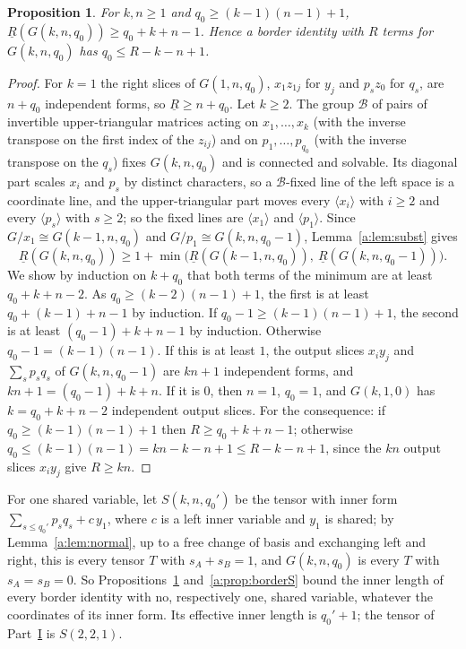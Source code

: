 \documentclass[11pt]{article}
\newtheorem{proposition}[theorem]{Proposition}
\theoremstyle{definition}
\theoremstyle{remark}
\begin{document}
\begin{proposition}\label{a:prop:borderG}
For $k,n\ge1$ and $q_0\ge(k-1)(n-1)+1$, $\underline R(G(k,n,q_0))\ge q_0+k+n-1$. Hence a border identity with $R$ terms for $G(k,n,q_0)$ has $q_0\le R-k-n+1$.
\end{proposition}

\begin{proof}
For $k=1$ the right slices of $G(1,n,q_0)$, $x_1z_{1j}$ for $y_j$ and $p_sz_0$ for $q_s$, are $n+q_0$ independent forms, so $\underline R\ge n+q_0$. Let $k\ge2$. The group $\mathcal B$ of pairs of invertible upper-triangular matrices acting on $x_1,\dots,x_k$ (with the inverse transpose on the first index of the $z_{ij}$) and on $p_1,\dots,p_{q_0}$ (with the inverse transpose on the $q_s$) fixes $G(k,n,q_0)$ and is connected and solvable. Its diagonal part scales $x_i$ and $p_s$ by distinct characters, so a $\mathcal B$-fixed line of the left space is a coordinate line, and the upper-triangular part moves every $\langle x_i\rangle$ with $i\ge2$ and every $\langle p_s\rangle$ with $s\ge2$; so the fixed lines are $\langle x_1\rangle$ and $\langle p_1\rangle$. Since $G/x_1\cong G(k-1,n,q_0)$ and $G/p_1\cong G(k,n,q_0-1)$, Lemma~\ref{a:lem:subst} gives
\[
\underline R(G(k,n,q_0))\ge1+\min\big(\underline R(G(k-1,n,q_0)),\ \underline R(G(k,n,q_0-1))\big).
\]
We show by induction on $k+q_0$ that both terms of the minimum are at least $q_0+k+n-2$. As $q_0\ge(k-2)(n-1)+1$, the first is at least $q_0+(k-1)+n-1$ by induction. If $q_0-1\ge(k-1)(n-1)+1$, the second is at least $(q_0-1)+k+n-1$ by induction. Otherwise $q_0-1=(k-1)(n-1)$. If this is at least $1$, the output slices $x_iy_j$ and $\sum_sp_sq_s$ of $G(k,n,q_0-1)$ are $kn+1$ independent forms, and $kn+1=(q_0-1)+k+n$. If it is $0$, then $n=1$, $q_0=1$, and $G(k,1,0)$ has $k=q_0+k+n-2$ independent output slices. For the consequence: if $q_0\ge(k-1)(n-1)+1$ then $R\ge q_0+k+n-1$; otherwise $q_0\le(k-1)(n-1)=kn-k-n+1\le R-k-n+1$, since the $kn$ output slices $x_iy_j$ give $R\ge kn$.
\end{proof}

For one shared variable, let $S(k,n,q_0')$ be the tensor with inner form $\sum_{s\le q_0'}p_sq_s+c\,y_1$, where $c$ is a left inner variable and $y_1$ is shared; by Lemma~\ref{a:lem:normal}, up to a free change of basis and exchanging left and right, this is every tensor $T$ with $s_A+s_B=1$, and $G(k,n,q_0)$ is every $T$ with $s_A=s_B=0$. So Propositions~\ref{a:prop:borderG} and~\ref{a:prop:borderS} bound the inner length of every border identity with no, respectively one, shared variable, whatever the coordinates of its inner form. Its effective inner length is $q_0'+1$; the tensor of Part~\hyperref[m:partI]{I} is $S(2,2,1)$.
\end{document}
